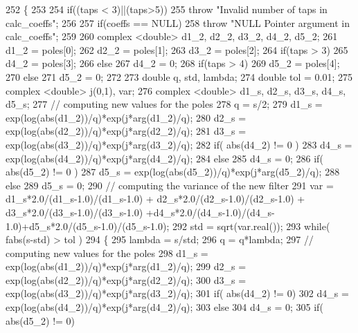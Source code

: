 \begin{DoxyCode}
252 \{
253 
254     \textcolor{keywordflow}{if}((taps < 3)||(taps>5))
255         \textcolor{keywordflow}{throw} \textcolor{stringliteral}{"Invalid number of taps in calc\_coeffs"};
256     
257     \textcolor{keywordflow}{if}(coeffs == NULL)
258         \textcolor{keywordflow}{throw} \textcolor{stringliteral}{"NULL Pointer argument in calc\_coeffs"};
259 
260     complex <double> d1\_2, d2\_2, d3\_2, d4\_2, d5\_2;
261     d1\_2 = poles[0];
262     d2\_2 = poles[1];
263     d3\_2 = poles[2];
264     \textcolor{keywordflow}{if}(taps > 3)
265         d4\_2 = poles[3];
266     \textcolor{keywordflow}{else}
267         d4\_2 = 0;
268     \textcolor{keywordflow}{if}(taps > 4)
269         d5\_2 = poles[4];
270     \textcolor{keywordflow}{else}
271         d5\_2 = 0;
272     
273     \textcolor{keywordtype}{double} q, std, lambda;
274     \textcolor{keywordtype}{double} tol = 0.01;
275     complex <double> j(0,1), var;
276     complex <double> d1\_s, d2\_s, d3\_s, d4\_s, d5\_s;
277     \textcolor{comment}{// computing new values for the poles}
278     q = s/2;
279     d1\_s = exp(log(abs(d1\_2))/q)*exp(j*arg(d1\_2)/q);
280     d2\_s = exp(log(abs(d2\_2))/q)*exp(j*arg(d2\_2)/q);
281     d3\_s = exp(log(abs(d3\_2))/q)*exp(j*arg(d3\_2)/q);
282     \textcolor{keywordflow}{if}( abs(d4\_2) != 0 )
283         d4\_s = exp(log(abs(d4\_2))/q)*exp(j*arg(d4\_2)/q);
284     \textcolor{keywordflow}{else}
285         d4\_s = 0;
286     \textcolor{keywordflow}{if}( abs(d5\_2) != 0 )
287         d5\_s = exp(log(abs(d5\_2))/q)*exp(j*arg(d5\_2)/q);
288     \textcolor{keywordflow}{else}
289         d5\_s = 0;
290     \textcolor{comment}{// computing the variance of the new filter}
291     var =  d1\_s*2.0/(d1\_s-1.0)/(d1\_s-1.0) + d2\_s*2.0/(d2\_s-1.0)/(d2\_s-1.0) + d3\_s*2.0/(d3\_s-1.0)/(d3\_s-1.0)
      +d4\_s*2.0/(d4\_s-1.0)/(d4\_s-1.0)+d5\_s*2.0/(d5\_s-1.0)/(d5\_s-1.0);
292     std = sqrt(var.real());
293     \textcolor{keywordflow}{while}( fabs(s-std) > tol )
294     \{
295         lambda = s/std;
296         q = q*lambda;
297         \textcolor{comment}{// computing new values for the poles}
298         d1\_s = exp(log(abs(d1\_2))/q)*exp(j*arg(d1\_2)/q);
299         d2\_s = exp(log(abs(d2\_2))/q)*exp(j*arg(d2\_2)/q);
300         d3\_s = exp(log(abs(d3\_2))/q)*exp(j*arg(d3\_2)/q);
301         \textcolor{keywordflow}{if}( abs(d4\_2) != 0)
302             d4\_s = exp(log(abs(d4\_2))/q)*exp(j*arg(d4\_2)/q);
303         \textcolor{keywordflow}{else}
304             d4\_s = 0;
305         \textcolor{keywordflow}{if}( abs(d5\_2) != 0)

\end{DoxyCode}
